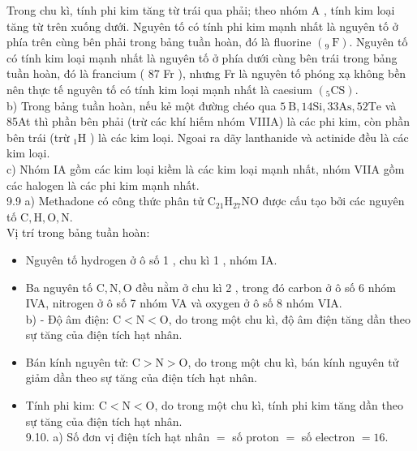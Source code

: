 \documentclass[10pt]{article}
\begin{document}
Trong chu kì, tính phi kim tăng từ trái qua phải; theo nhóm A , tính kim loại tăng từ trên xuống dưới. Nguyên tố có tính phi kim mạnh nhất là nguyên tố ở phía trên cùng bên phải trong bảng tuần hoàn, đó là fluorine $\left({ }_{9} \mathrm{~F}\right)$. Nguyên tố có tính kim loại mạnh nhất là nguyên tố ở phía dưới cùng bên trái trong bảng tuần hoàn, đó là francium ( 87 Fr ), nhưng Fr là nguyên tố phóng xạ không bền nên thực tế nguyên tố có tính kim loại mạnh nhất là caesium $\left({ }_{5} \mathrm{CS}\right)$.\\
b) Trong bảng tuần hoàn, nếu kẻ một đường chéo qua $5 \mathrm{~B}, 14 \mathrm{Si}, 33 \mathrm{As}, 52 \mathrm{Te}$ và 85At thì phần bên phải (trừ các khí hiếm nhóm VIIIA) là các phi kim, còn phần bên trái (trừ ${ }_{1} \mathrm{H}$ ) là các kim loại. Ngoai ra dãy lanthanide và actinide đều là các kim loại.\\
c) Nhóm IA gồm các kim loại kiềm là các kim loại mạnh nhất, nhóm VIIA gồm các halogen là các phi kim mạnh nhất.\\
9.9 a) Methadone có công thức phân tử $\mathrm{C}_{21} \mathrm{H}_{27} \mathrm{NO}$ được cấu tạo bởi các nguyên tố $\mathrm{C}, \mathrm{H}, \mathrm{O}, \mathrm{N}$.\\
Vị trí trong bảng tuần hoàn:

\begin{itemize}
  \item Nguyên tố hydrogen ở ô số 1 , chu kì 1 , nhóm IA.
  \item Ba nguyên tố $\mathrm{C}, \mathrm{N}, \mathrm{O}$ đều nằm ở chu kì 2 , trong đó carbon ở ô số 6 nhóm IVA, nitrogen ở ô số 7 nhóm VA và oxygen ở ô số 8 nhóm VIA.\\
b) - Độ âm điện: $\mathrm{C}<\mathrm{N}<\mathrm{O}$, do trong một chu kì, độ âm điện tăng dần theo sự tăng của điện tích hạt nhân.
  \item Bán kính nguyên tử: $\mathrm{C}>\mathrm{N}>\mathrm{O}$, do trong một chu kì, bán kính nguyên tử giảm dần theo sự tăng của điện tích hạt nhân.
  \item Tính phi kim: $\mathrm{C}<\mathrm{N}<\mathrm{O}$, do trong một chu kì, tính phi kim tăng dần theo sự tăng của điện tích hạt nhân.\\
9.10. a) Số đơn vị điện tích hạt nhân $=$ số proton $=$ số electron $=16$.
\end{itemize}
\end{document}

